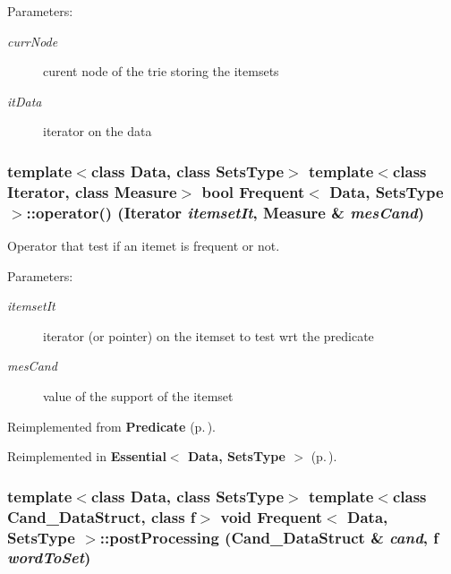 \begin{Desc}
\item[Parameters:]
\begin{description}
\item[{\em curr\-Node}]curent node of the trie storing the itemsets \item[{\em it\-Data}]iterator on the data \end{description}
\end{Desc}
\subsubsection{\setlength{\rightskip}{0pt plus 5cm}template$<$class Data, class Sets\-Type$>$ template$<$class Iterator, class Measure$>$ bool {\bf Frequent}$<$ Data, Sets\-Type $>$::operator() (Iterator {\em itemset\-It}, Measure \& {\em mes\-Cand})\hspace{0.3cm}{\tt  [inline]}}\label{class_frequent_82e02ab1cf1749ea52e9603dc06a5d15}


Operator that test if an itemet is frequent or not. 

\begin{Desc}
\item[Parameters:]
\begin{description}
\item[{\em itemset\-It}]iterator (or pointer) on the itemset to test wrt the predicate \item[{\em mes\-Cand}]value of the support of the itemset \end{description}
\end{Desc}


Reimplemented from {\bf Predicate} {\rm (p.\,\pageref{class_predicate_6fb1a75dba2268f75738f335f403e46c})}.

Reimplemented in {\bf Essential$<$ Data, Sets\-Type $>$} {\rm (p.\,\pageref{class_essential_e6a89fa2543fe441619066b0f4f6323b})}.
\subsubsection{\setlength{\rightskip}{0pt plus 5cm}template$<$class Data, class Sets\-Type$>$ template$<$class Cand\_\-Data\-Struct, class f$>$ void {\bf Frequent}$<$ Data, Sets\-Type $>$::post\-Processing (Cand\_\-Data\-Struct \& {\em cand}, f {\em word\-To\-Set})}\label{class_frequent_ff29167beb828195c34e10881abb2f74}


